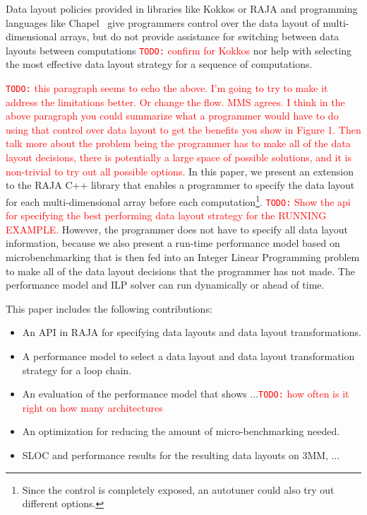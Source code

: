 \documentclass[sigconf, table]{acmart}
\newcommand{\todo}[1]{{\textcolor{red}{{\tt{TODO:}}\,\,#1 }}}
\begin{document}
Data layout policies provided in libraries like Kokkos or RAJA
and programming languages like Chapel~\cite{diaconescu2007approach} give
programmers control over the data layout of multi-dimensional arrays, but do not 
provide assistance for switching between data layouts between computations \todo{confirm for Kokkos}
nor help with selecting the most effective data layout strategy for a sequence of computations.

\todo{this paragraph seems to echo the above. I'm going to try to make it address the limitations better. Or change the flow.  MMS agrees.  I think in the above paragraph you could summarize what a programmer
would have to do using that control over data layout to get the benefits you show in Figure 1.
Then talk more about the problem being the programmer has to make all of the data layout decisions,
there is potentially a large space of possible solutions, and it is non-trivial to try out all possible options.}
In this paper, we present an extension to the RAJA C++ library that enables a programmer
to specify the data layout for each multi-dimensional array before each 
computation\footnote{Since the control is completely exposed, an autotuner could also try out different options.}.
\todo{Show the api for specifying the best performing data layout strategy
for the RUNNING EXAMPLE.}
However, the programmer does not have to specify all data layout information, because
we also present a run-time performance model based on microbenchmarking that is
then fed into an Integer Linear Programming problem to make all of the data layout decisions
that the programmer has not made.
The performance model and ILP solver can run dynamically or ahead of time.

This paper includes the following contributions:
\begin{itemize}
\item An API in RAJA for specifying data layouts and data layout transformations.
\item A performance model to select a data layout and data layout transformation strategy for 
         a loop chain.
\item An evaluation of the performance model that shows ...\todo{how often is it right on how many architectures}
\item An optimization for reducing the amount of micro-benchmarking needed.
\item SLOC and performance results for the resulting data layouts on 3MM, ...
\end{itemize} 
\end{document}
